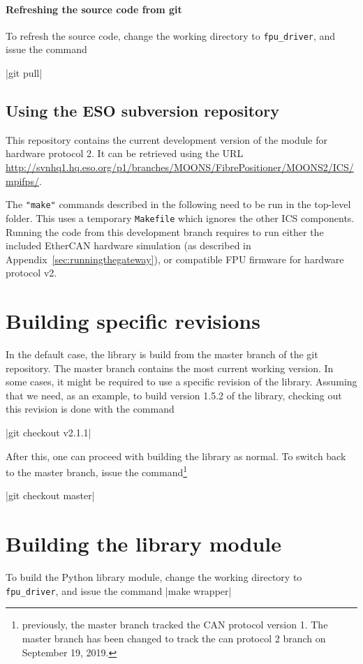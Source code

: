 \documentclass[fontsize=12,a4paper]{scrreprt}
\begin{document}
\paragraph{Refreshing the source code from git}
To refresh the source code, change the
working directory to \texttt{fpu\_driver},
and issue the command

|git pull|

\subsection{Using the ESO subversion repository}

This repository contains the current development version of the module
for hardware protocol 2. It can be retrieved using the URL
\url{http://svnhq1.hq.eso.org/p1/branches/MOONS/FibrePositioner/MOONS2/ICS/mpifps/}.

The \texttt{"make"} commands described in the following need to be run
in the top-level folder. This uses a temporary \texttt{Makefile} which
ignores the other ICS components. Running the code from this
development branch requires to run either the included EtherCAN
hardware simulation (as described in
Appendix~\ref{sec:runningthegateway}), or compatible FPU firmware for
hardware protocol v2.

\section{Building specific revisions}
In the default case, the library is build from
the master branch of the git repository.
The master branch contains the most current
working version.
In some cases, it might be required to
use a specific revision of the library.
Assuming that we need, as an example,
to build version 1.5.2 of the library,
checking out this revision is done with the
command

|git checkout v2.1.1|

After this, one can proceed with building the library as normal. To
switch back to the master branch, issue the command\footnote{
  previously, the master branch tracked the CAN protocol version 1.
  The master branch has been changed to track the can protocol 2 branch
on September 19, 2019.}

|git checkout master|


\section{Building the library module}
To build the Python library module,
change the working directory to \texttt{fpu\_driver},
and issue the command |make wrapper|
\end{document}
